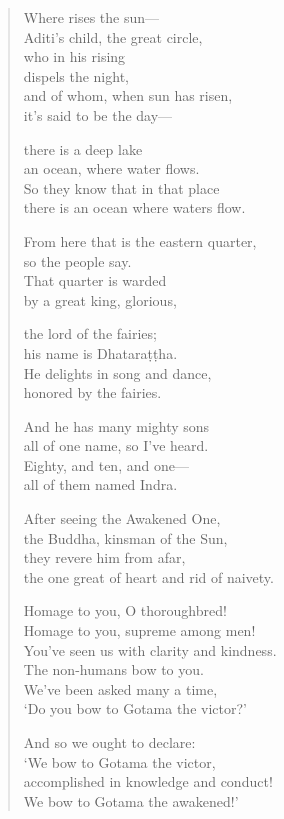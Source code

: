 \documentclass[12pt,openany]{book}%
\begin{document}
\begin{verse}
Where rises the sun—\\
Aditi’s child, the great circle, \\
who in his rising \\
dispels the night, \\
and of whom, when sun has risen, \\
it’s said to be the day—

there is a deep lake \\
an ocean, where water flows. \\
So they know that in that place \\
there is an ocean where waters flow. 

From here that is the eastern quarter, \\
so the people say. \\
That quarter is warded \\
by a great king, glorious, 

the lord of the fairies; \\
his name is \textsanskrit{Dhataraṭṭha}. \\
He delights in song and dance, \\
honored by the fairies. 

And he has many mighty sons \\
all of one name, so I’ve heard. \\
Eighty, and ten, and one—\\
all of them named Indra. 

After seeing the Awakened One, \\
the Buddha, kinsman of the Sun, \\
they revere him from afar, \\
the one great of heart and rid of naivety. 

Homage to you, O thoroughbred! \\
Homage to you, supreme among men! \\
You’ve seen us with clarity and kindness. \\
The non-humans bow to you. \\
We’ve been asked many a time, \\
‘Do you bow to Gotama the victor?’ 

And so we ought to declare: \\
‘We bow to Gotama the victor, \\
accomplished in knowledge and conduct! \\
We bow to Gotama the awakened!’ 


\end{verse}
\end{document}
